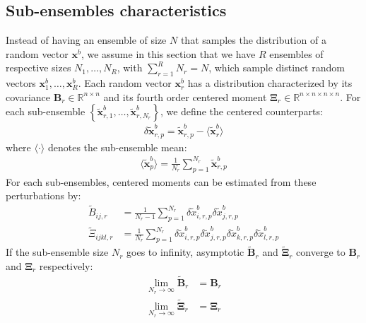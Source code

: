 \documentclass[12pt]{scrartcl}
\begin{document}
\subsection{Sub-ensembles characteristics}
Instead of having an ensemble of size $N$ that samples the distribution of a random vector $\mathbf{x}^b$, we assume in this section that we have $R$ ensembles of respective sizes $N_1,\dots,N_R$, with $\sum_{r=1}^R N_r = N$, which sample distinct random vectors $\mathbf{x}^b_1,\dots,\mathbf{x}^b_R$. Each random vector $\mathbf{x}^b_r$ has a distribution characterized by its covariance $\mathbf{B}_r \in \mathbb{R}^{n \times n}$ and its fourth order centered moment $\boldsymbol{\Xi}_r \in \mathbb{R}^{n \times n \times n \times n}$. For each sub-ensemble $\left\{\widetilde{\mathbf{x}}^b_{r,1},\dots,\widetilde{\mathbf{x}}^b_{r,N_r}\right\}$, we define the centered counterparts:
\begin{align}
\delta \widetilde{\mathbf{x}}^b_{r,p} = \widetilde{\mathbf{x}}^b_{r,p} - \langle \widetilde{\mathbf{x}}^b _r\rangle
\end{align}
where $\langle \cdot \rangle$ denotes the sub-ensemble mean:
\begin{align}
\langle \widetilde{\mathbf{x}}^b_p \rangle = \frac{1}{N_r} \sum_{p=1}^{N_r} \widetilde{\mathbf{x}}^b_{r,p}
\end{align}
For each sub-ensembles, centered moments can be estimated from these perturbations by:
\begin{subequations}
\begin{align}
\widetilde{B}_{ij,r} & = \frac{1}{N_r-1} \sum_{p=1}^{N_r} \delta \widetilde{x}^b_{i,r,p} \delta \widetilde{x}^b_{j,r,p}  \\
\widetilde{\Xi}_{ijkl,r} & = \frac{1}{N_r} \sum_{p=1}^{N_r} \delta \widetilde{x}^b_{i,r,p} \delta \widetilde{x}^b_{j,r,p} \delta \widetilde{x}^b_{k,r,p} \delta \widetilde{x}^b_{l,r,p} 
\end{align}
\end{subequations}
$  $\\
If the sub-ensemble size $N_r$ goes to infinity, asymptotic $\widetilde{\mathbf{B}}_r$ and $\widetilde{\boldsymbol{\Xi}}_r$ converge to $\mathbf{B}_r$ and $\boldsymbol{\Xi}_r$ respectively:
\begin{subequations}
\begin{align}
\lim_{N_r \rightarrow \infty} \widetilde{\mathbf{B}}_r & = \mathbf{B}_r \\
\lim_{N_r \rightarrow \infty} \widetilde{\boldsymbol{\Xi}}_r & = \boldsymbol{\Xi}_r
\end{align}
\end{subequations}
\end{document}
